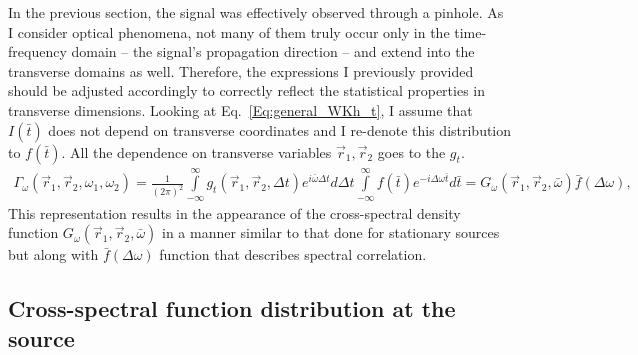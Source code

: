     In the previous section, the signal was effectively observed through a pinhole. As I consider optical phenomena, not many of them truly occur only in the time-frequency domain -- the signal's propagation direction -- and extend into the transverse domains as well. Therefore, the expressions I previously provided should be adjusted accordingly to correctly reflect the statistical properties in transverse dimensions.
    Looking at Eq.~\ref{Eq:general_WKh_t},  I assume that $I(\bar{t})$ does not depend on transverse coordinates and I re-denote this distribution to $f(\bar{t})$. All the dependence on transverse variables $\vec{r}_1, \vec{r}_2$ goes to the $g_t$.
    \begin{align}
        \Gamma_{\omega}(\vec{r}_1, \vec{r}_2, \omega_1, \omega_2) = \frac{1}{(2 \pi)^2} \int \limits_{-\infty}^{\infty}  g_t(\vec{r}_1, \vec{r}_2, \Delta t) e^{i \bar{\omega} \Delta t} d \Delta t  \int \limits_{-\infty}^{\infty} f(\bar{t}) e^{-i \Delta \omega \bar{t}} d\bar{t} = G_{\omega}(\vec{r}_1, \vec{r}_2, \bar{\omega})\bar{f}(\Delta \omega),
        \label{Eq:}
    \end{align}    
    This representation results in the appearance of the cross-spectral density function $G_{\omega}(\vec{r}_1, \vec{r}_2, \bar{\omega})$ in a manner similar to that done for stationary sources but along with $\bar{f}(\Delta \omega)$ function that describes spectral correlation.

\subsection{Cross-spectral function distribution at the source}

